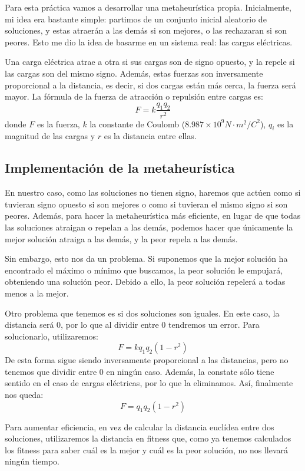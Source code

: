 \documentclass[11pt,a4paper]{article}
\begin{document}
Para esta práctica vamos a desarrollar una metaheurística propia. Inicialmente, mi idea era bastante simple: partimos de un conjunto inicial aleatorio de soluciones, y estas atraerán a las demás si son mejores, o las rechazaran si son peores. Esto me dio la idea de basarme en un sistema real: las cargas eléctricas.

Una carga eléctrica atrae a otra si sus cargas son de signo opuesto, y la repele si las cargas son del mismo signo. Además, estas fuerzas son inversamente proporcional a la distancia, es decir, si dos cargas están más cerca, la fuerza será mayor. La fórmula de la fuerza de atracción o repulsión entre cargas es:
$$F = k \frac{q_{1}q_{2}}{r^{2}}$$
donde $F$ es la fuerza, $k$ la constante de Coulomb ($8.987 \times 10^{9} N \cdot m^{2} / C^{2}$), $q_{i}$ es la magnitud de las cargas y $r$ es la distancia entre ellas.

\subsection{Implementación de la metaheurística}

En nuestro caso, como las soluciones no tienen signo, haremos que actúen como si tuvieran signo opuesto si son mejores o como si tuvieran el mismo signo si son peores. Además, para hacer la metaheurística más eficiente, en lugar de que todas las soluciones atraigan o repelan a las demás, podemos hacer que únicamente la mejor solución atraiga a las demás, y la peor repela a las demás.

Sin embargo, esto nos da un problema. Si suponemos que la mejor solución ha encontrado el máximo o mínimo que buscamos, la peor solución le empujará, obteniendo una solución peor. Debido a ello, la peor solución repelerá a todas menos a la mejor.

Otro problema que tenemos es si dos soluciones son iguales. En este caso, la distancia será 0, por lo que al dividir entre 0 tendremos un error. Para solucionarlo, utilizaremos:
$$F = k q_{1}q_{2} (1 - r^{2})$$
De esta forma sigue siendo inversamente proporcional a las distancias, pero no tenemos que dividir entre 0 en ningún caso. Además, la constate sólo tiene sentido en el caso de cargas eléctricas, por lo que la eliminamos. Así, finalmente nos queda:
$$F = q_{1}q_{2} (1 - r^{2})$$

Para aumentar eficiencia, en vez de calcular la distancia euclídea entre dos soluciones, utilizaremos la distancia en fitness que, como ya tenemos calculados los fitness para saber cuál es la mejor y cuál es la peor solución, no nos llevará ningún tiempo.
\end{document}
